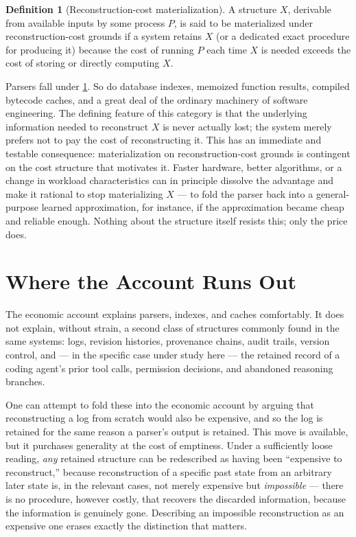 \documentclass[11pt]{book}
\theoremstyle{plain}
\theoremstyle{definition}
\newtheorem{definition}[theorem]{Definition}
\theoremstyle{remark}
\begin{document}
\begin{definition}[Reconstruction-cost materialization]
\label{def:reconstruction-cost}
A structure $X$, derivable from available inputs by some
process $P$, is said to be materialized under reconstruction-cost
grounds if a system retains $X$ (or a dedicated exact procedure for
producing it) because the cost of running $P$ each time $X$ is needed
exceeds the cost of storing or directly computing $X$.
\end{definition}

Parsers fall under \cref{def:reconstruction-cost}. So do database
indexes, memoized function results, compiled bytecode caches, and a
great deal of the ordinary machinery of software engineering. The
defining feature of this category is that the underlying information
needed to reconstruct $X$ is never actually lost; the system merely
prefers not to pay the cost of reconstructing it. This has an
immediate and testable consequence: materialization on
reconstruction-cost grounds is contingent on the cost structure that
motivates it. Faster hardware, better algorithms, or a change in
workload characteristics can in principle dissolve the advantage and
make it rational to stop materializing $X$ --- to fold the parser back
into a general-purpose learned approximation, for instance, if the
approximation became cheap and reliable enough. Nothing about the
structure itself resists this; only the price does.

\section{Where the Account Runs Out}

The economic account explains parsers, indexes, and caches
comfortably. It does not explain, without strain, a second class of
structures commonly found in the same systems: logs, revision
histories, provenance chains, audit trails, version control, and ---
in the specific case under study here --- the retained record of a
coding agent's prior tool calls, permission decisions, and abandoned
reasoning branches.

One can attempt to fold these into the economic account by arguing
that reconstructing a log from scratch would also be expensive, and so
the log is retained for the same reason a parser's output is retained.
This move is available, but it purchases generality at the cost of
emptiness. Under a sufficiently loose reading, \emph{any} retained
structure can be redescribed as having been \enquote{expensive to
reconstruct,} because reconstruction of a specific past state from an
arbitrary later state is, in the relevant cases, not merely expensive
but \emph{impossible} --- there is no procedure, however costly, that
recovers the discarded information, because the information is
genuinely gone. Describing an impossible reconstruction as an
expensive one erases exactly the distinction that matters.
\end{document}
